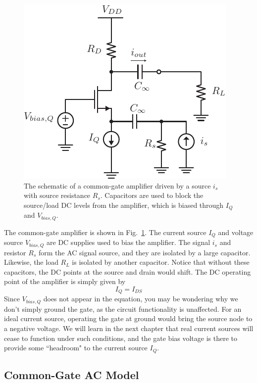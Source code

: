 \begin{figure}[tb]
\begin{center}
\includegraphics[scale=1]{cgamp_is}
\end{center}
\caption{The schematic of a common-gate amplifier driven by a source $i_s$ with source resistance $R_s$.  Capacitors are used to block the source/load DC levels from the amplifier, which is biased through $I_Q$ and $V_{bias,Q}$.} \label{fig:cgamp_is}
\end{figure}
 
The common-gate amplifier is shown in Fig.~\ref{fig:cgamp_is}.  The current source $I_Q$ and voltage source $V_{bias,Q}$ are DC supplies used to bias the amplifier.  The signal $i_s$ and resistor $R_s$ form the AC signal source, and they are isolated by a large capacitor.  Likewise, the load $R_L$ is isolated by another capacitor.  Notice that without these capacitors, the DC points at the source and drain would shift.  The DC operating point of the amplifier is simply given by
%
\begin{equation}
	{I_Q} = {I_{DS}}
\end{equation}
%
Since $V_{bias,Q}$ does not appear in the equation, you may be wondering why we don't simply ground the gate, as the circuit functionality is unaffected.  For an ideal current source, operating the gate at ground would bring the source node to a negative voltage.  We will learn in the next chapter that real current sources will cease to function under such conditions, and the gate bias voltage is there to provide some ``headroom" to the current source $I_Q$.

\subsection{Common-Gate AC Model}

